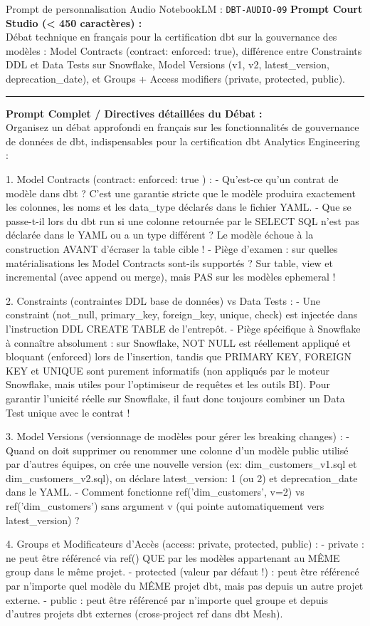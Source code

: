 \documentclass[11pt,a4paper]{article}
\begin{document}
\begin{promptbox}{Prompt de personnalisation Audio NotebookLM : \texttt{DBT-AUDIO-09}}
\textbf{Prompt Court Studio (< 450 caractères) :}\\
Débat technique en français pour la certification dbt sur la gouvernance des modèles : Model Contracts (contract: enforced: true), différence entre Constraints DDL et Data Tests sur Snowflake, Model Versions (v1, v2, latest\_version, deprecation\_date), et Groups + Access modifiers (private, protected, public).

\medskip\hrule\medskip
\textbf{Prompt Complet / Directives détaillées du Débat :}\\
Organisez un débat approfondi en français sur les fonctionnalités de gouvernance de données de dbt, indispensables pour la certification dbt Analytics Engineering :

1. Model Contracts (contract: { enforced: true }) :
- Qu'est-ce qu'un contrat de modèle dans dbt ? C'est une garantie stricte que le modèle produira exactement les colonnes, les noms et les data\_type déclarés dans le fichier YAML.
- Que se passe-t-il lors du dbt run si une colonne retournée par le SELECT SQL n'est pas déclarée dans le YAML ou a un type différent ? Le modèle échoue à la construction AVANT d'écraser la table cible !
- Piège d'examen : sur quelles matérialisations les Model Contracts sont-ils supportés ? Sur table, view et incremental (avec append ou merge), mais PAS sur les modèles ephemeral !

2. Constraints (contraintes DDL base de données) vs Data Tests :
- Une constraint (not\_null, primary\_key, foreign\_key, unique, check) est injectée dans l'instruction DDL CREATE TABLE de l'entrepôt.
- Piège spécifique à Snowflake à connaître absolument : sur Snowflake, NOT NULL est réellement appliqué et bloquant (enforced) lors de l'insertion, tandis que PRIMARY KEY, FOREIGN KEY et UNIQUE sont purement informatifs (non appliqués par le moteur Snowflake, mais utiles pour l'optimiseur de requêtes et les outils BI). Pour garantir l'unicité réelle sur Snowflake, il faut donc toujours combiner un Data Test unique avec le contrat !

3. Model Versions (versionnage de modèles pour gérer les breaking changes) :
- Quand on doit supprimer ou renommer une colonne d'un modèle public utilisé par d'autres équipes, on crée une nouvelle version (ex: dim\_customers\_v1.sql et dim\_customers\_v2.sql), on déclare latest\_version: 1 (ou 2) et deprecation\_date dans le YAML.
- Comment fonctionne ref('dim\_customers', v=2) vs ref('dim\_customers') sans argument v (qui pointe automatiquement vers latest\_version) ?

4. Groups et Modificateurs d'Accès (access: private, protected, public) :
- private : ne peut être référencé via ref() QUE par les modèles appartenant au MÊME group dans le même projet.
- protected (valeur par défaut !) : peut être référencé par n'importe quel modèle du MÊME projet dbt, mais pas depuis un autre projet externe.
- public : peut être référencé par n'importe quel groupe et depuis d'autres projets dbt externes (cross-project ref dans dbt Mesh).
\end{promptbox}
\end{document}
